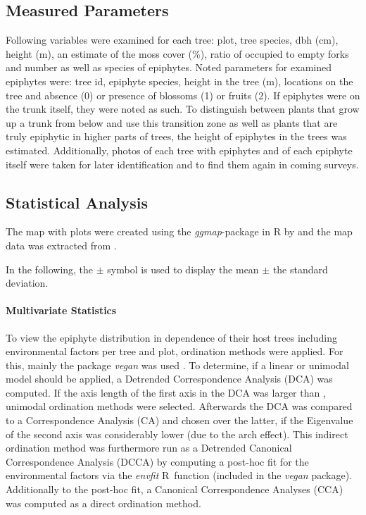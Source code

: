 \documentclass[12pt, a4paper, oneside, draft]{article}
\begin{document}
	\subsection{Measured Parameters}
	Following variables were examined for each tree: plot, tree species, dbh (cm), height (m), an estimate of the moss cover (\%), ratio of occupied to empty forks and number as well as species of epiphytes. Noted parameters for examined epiphytes were: tree id, epiphyte species, height in the tree (m), locations on the tree  and absence (0) or presence of blossoms (1) or fruits (2). If epiphytes were on the trunk itself, they were noted as such. To distinguish between plants that grow up a trunk from below and use this transition zone as well as plants that are truly epiphytic in higher parts of trees, the height of epiphytes in the trees was estimated. Additionally, photos of each tree with epiphytes and of each epiphyte itself were taken for later identification and to find them again in coming surveys.
	
	\subsection{Statistical Analysis}
	
	The map with plots were created using the \textit{ggmap}-package in R by \textcite{Kahle2013} and the map data was extracted from \textcite{GoogleMaps2017}.
	
	In the following, the $\pm$ symbol is used to display the mean $\pm$ the standard deviation.
		
		\paragraph{Multivariate Statistics} 
		To view the epiphyte distribution in dependence of their host trees including environmental factors per tree and plot, ordination methods were applied. For this, mainly the package \textit{vegan} was used \parencite{Oksanen2017}. To determine, if a linear or unimodal model should be applied, a Detrended Correspondence Analysis (DCA) was computed. If the axis length of the first axis in the DCA was larger than , unimodal ordination methods were selected. Afterwards the DCA was compared to a Correspondence Analysis (CA) and chosen over the latter, if the Eigenvalue of the second axis was considerably lower (due to the arch effect). This indirect ordination method was furthermore run as a Detrended Canonical Correspondence Analysis (DCCA) by computing a post-hoc fit for the environmental factors via the \textit{envfit} R~function (included in the \textit{vegan} package). Additionally to the post-hoc fit, a Canonical Correspondence Analyses (CCA) was computed as a direct ordination method. 
		
\end{document}
